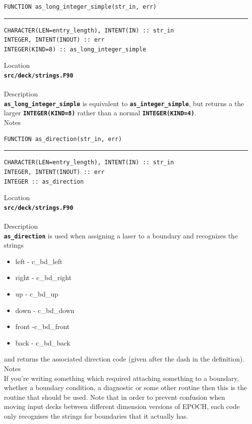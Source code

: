 \documentclass[12pt,a4paper]{article}
\newcommand{\HRule}{\rule{\linewidth}{0.5mm}}
\newcommand{\inlinecode}[1]{{\color{warwickred} \bf\texttt{#1}}}
\newcommand{\codedef}{\begin{Verbatim}[formatcom=\color{warwickred},fontsize=\Large,hfuzz=0pt]}
\newcommand{\coderule}{
{\color{warwickred}\vspace{-0.5cm}\HRule}
\codedef}
\begin{document}
\pagebreak
\codedef
FUNCTION as_long_integer_simple(str_in, err)
\end{Verbatim}
\coderule
CHARACTER(LEN=entry_length), INTENT(IN) :: str_in
INTEGER, INTENT(INOUT) :: err
INTEGER(KIND=8) :: as_long_integer_simple
\end{Verbatim}
\vspace{1cm}
{\Large Location\\}
\inlinecode{src/deck/strings.F90}\\
\\[0.5cm]
{\Large Description\\}
\inlinecode{as\_long\_integer\_simple} is equivalent to \inlinecode{as\_integer\_simple}, but returns a the larger \inlinecode{INTEGER(KIND=8)} rather than a normal \inlinecode{INTEGER(KIND=4)}.
\\[0.5cm]
{\Large Notes\\}

\pagebreak
\codedef
FUNCTION as_direction(str_in, err)
\end{Verbatim}
\coderule
CHARACTER(LEN=entry_length), INTENT(IN) :: str_in
INTEGER, INTENT(INOUT) :: err
INTEGER :: as_direction
\end{Verbatim}
\vspace{1cm}
{\Large Location\\}
\inlinecode{src/deck/strings.F90}\\
\\[0.5cm]
{\Large Description\\}
\inlinecode{as\_direction} is used when assigning a laser to a boundary and
recognizes the strings
\begin{itemize}
\item left - c\_bd\_left
\item right - c\_bd\_right
\item up - c\_bd\_up
\item down - c\_bd\_down
\item front -c\_bd\_front
\item back - c\_bd\_back
\end{itemize}
and returns the associated direction code (given after the dash in the
definition).
\\[0.5cm]
{\Large Notes\\}
If you're writing something which required attaching something to a boundary,
whether a boundary condition, a diagnostic or some other routine then this is
the routine that should be used. Note that in order to prevent confusion when
moving input decks between different dimension versions of EPOCH, each code
only recognises the strings for boundaries that it actually has.
\end{document}

